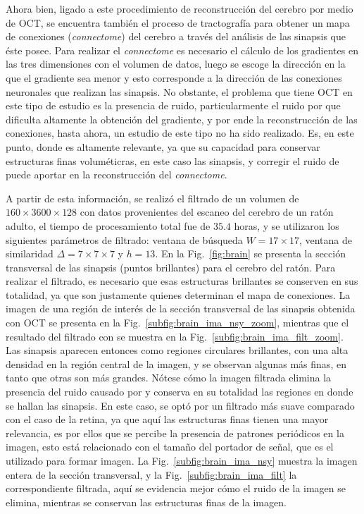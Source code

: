Ahora bien, ligado a este procedimiento de reconstrucción del cerebro por medio de OCT, se encuentra también el proceso de tractografía para obtener un mapa de conexiones (\emph{connectome}) del cerebro \cite{Chang2017} a través del análisis de las sinapsis que éste posee. Para realizar el \emph{connectome} es necesario el cálculo de los gradientes en las tres dimensiones con el volumen de datos, luego se escoge la dirección en la que el gradiente sea menor y esto corresponde a la dirección de las conexiones neuronales que realizan las sinapsis. No obstante, el problema que tiene OCT en este tipo de estudio es la presencia de ruido, particularmente el ruido por \speckle que dificulta altamente la obtención del gradiente, y por ende la reconstrucción de las conexiones, hasta ahora, un estudio de este tipo no ha sido realizado. Es, en este punto, donde \nlmeansOCT es altamente relevante, ya que su capacidad para conservar estructuras finas voluméticras, en este caso las sinapsis, y corregir el ruido de \speckle puede aportar en la reconstrucción del \emph{connectome}. 

A partir de esta información, se realizó el filtrado de un volumen de $160\times3600\times128$ con datos provenientes del escaneo del cerebro de un ratón adulto, el tiempo de procesamiento total fue de $35.4$ horas, y se utilizaron los siguientes parámetros de filtrado: ventana de búsqueda $W=17\times17$, ventana de similaridad $\Delta = 7\times7\times7$ y $h=13$. En la Fig.~\ref{fig:brain} se presenta la sección transversal de las sinapsis (puntos brillantes) para el cerebro del ratón. Para realizar el filtrado, es necesario que esas estructuras brillantes se conserven en sus totalidad, ya que son justamente quienes determinan el mapa de conexiones. La imagen de una región de interés de la sección transversal de las sinapsis obtenida con OCT se presenta en la Fig.~\ref{subfig:brain_ima_nsy_zoom}, mientras que el resultado del filtrado con \nlmeansOCT se muestra en la Fig.~\ref{subfig:brain_ima_filt_zoom}. Las sinapsis aparecen entonces como regiones circulares brillantes, con una alta densidad en la región central de la imagen, y se observan algunas más finas, en tanto que otras son más grandes. Nótese cómo la imagen filtrada elimina la presencia del ruido causado por \speckle y conserva en su totalidad las regiones en donde se hallan las sinapsis. En este caso, se optó por un filtrado más suave comparado con el caso de la retina, ya que aquí las estructuras finas tienen una mayor relevancia, es por ellos que se percibe la presencia de patrones periódicos en la imagen, esto está relacionado con el tamaño del \speckle portador de señal, que es el utilizado para formar imagen. La Fig.~\ref{subfig:brain_ima_nsy} muestra la imagen entera de la sección transversal, y la Fig.~\ref{subfig:brain_ima_filt} la correspondiente filtrada, aquí se evidencia mejor cómo el ruido de la imagen se elimina, mientras se conservan las estructuras finas de la imagen.

